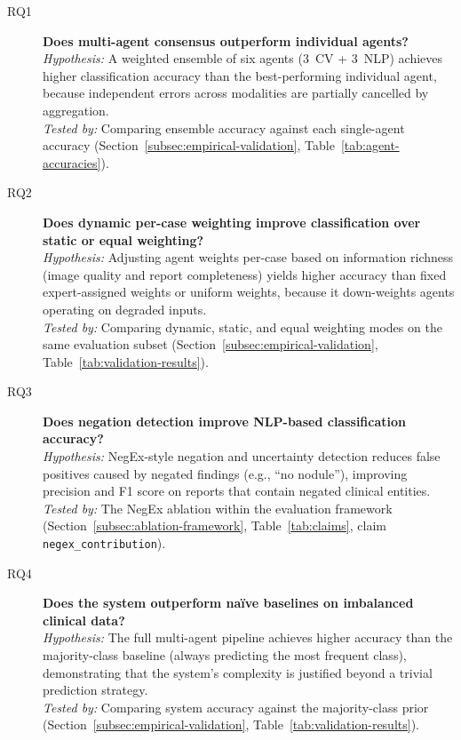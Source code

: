 \documentclass[12pt]{article}
\begin{document}
\begin{description}
    \item[RQ1] \textbf{Does multi-agent consensus outperform individual agents?}\\
    \emph{Hypothesis:} A weighted ensemble of six agents (3~CV + 3~NLP) achieves higher classification accuracy than the best-performing individual agent, because independent errors across modalities are partially cancelled by aggregation.\\
    \emph{Tested by:} Comparing ensemble accuracy against each single-agent accuracy (Section~\ref{subsec:empirical-validation}, Table~\ref{tab:agent-accuracies}).

    \item[RQ2] \textbf{Does dynamic per-case weighting improve classification over static or equal weighting?}\\
    \emph{Hypothesis:} Adjusting agent weights per-case based on information richness (image quality and report completeness) yields higher accuracy than fixed expert-assigned weights or uniform weights, because it down-weights agents operating on degraded inputs.\\
    \emph{Tested by:} Comparing dynamic, static, and equal weighting modes on the same evaluation subset (Section~\ref{subsec:empirical-validation}, Table~\ref{tab:validation-results}).

    \item[RQ3] \textbf{Does negation detection improve NLP-based classification accuracy?}\\
    \emph{Hypothesis:} NegEx-style negation and uncertainty detection reduces false positives caused by negated findings (e.g., ``no nodule''), improving precision and F1 score on reports that contain negated clinical entities.\\
    \emph{Tested by:} The NegEx ablation within the evaluation framework (Section~\ref{subsec:ablation-framework}, Table~\ref{tab:claims}, claim \texttt{negex\_contribution}).

    \item[RQ4] \textbf{Does the system outperform na\"ive baselines on imbalanced clinical data?}\\
    \emph{Hypothesis:} The full multi-agent pipeline achieves higher accuracy than the majority-class baseline (always predicting the most frequent class), demonstrating that the system's complexity is justified beyond a trivial prediction strategy.\\
    \emph{Tested by:} Comparing system accuracy against the majority-class prior (Section~\ref{subsec:empirical-validation}, Table~\ref{tab:validation-results}).
\end{description}
\end{document}
